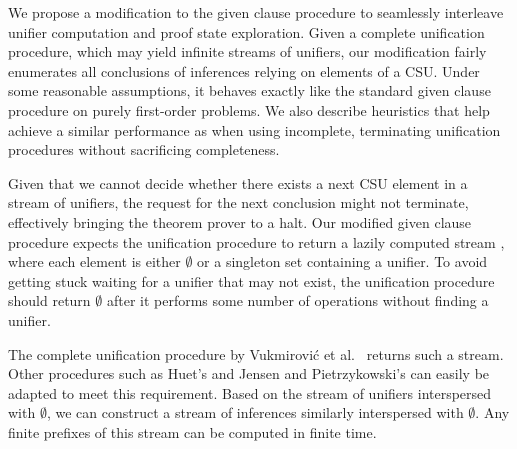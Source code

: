 \documentclass[smallcondensed,draft]{svjour3}     %
\begin{document}
We propose a modification to the given clause procedure to seamlessly
interleave unifier computation and proof state exploration. Given a complete
unification procedure, which may yield infinite streams of unifiers, our
modification fairly enumerates all conclusions of inferences relying on
elements of a CSU. Under some reasonable assumptions, it behaves exactly like
the standard given clause procedure on purely first-order problems.
We also describe heuristics that help achieve a similar
performance as when using incomplete, terminating unification procedures
without sacrificing completeness.

Given that we cannot decide whether there exists a next CSU
element in a stream of unifiers, the request for the next conclusion might not
terminate,
effectively bringing the theorem prover to a halt. Our modified given clause procedure
expects the unification procedure to return a lazily computed stream
\cite[Sect.~4.2]{co-1999-funds}, where each element is either $\emptyset$ or
a singleton set containing a unifier. To avoid getting stuck waiting for a unifier
that may not exist, the unification procedure should return
$\emptyset$ after it performs some number of operations without finding a unifier.

The complete unification procedure by Vukmirović et al.\
\cite{our-unif-paper} returns such a stream. Other procedures such
as Huet's \cite{gh-75-unification} and Jensen and
Pietrzykowski's \cite{jp-76-unif} can easily be adapted to meet this
requirement. Based on the stream of unifiers interspersed with $\emptyset$, we
can construct a stream of inferences similarly interspersed with $\emptyset$.
Any finite prefixes of this stream can be computed in finite time.
\end{document}
